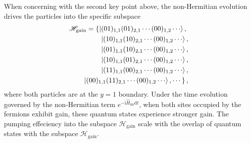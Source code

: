 \documentclass[longbibliography, aps, prx, amsmath, amssymb, amsfonts, twocolumn,superscriptaddress, footinbib]{revtex4-1}
\begin{document}
	When concerning with the second key point above,
	the non-Hermitian evolution drives the particles into the specific subspace
	\begin{equation}
		\begin{split}
			\mathscr{H}_{\text{gain}}=\left\{ \ket{(01)_{1,1}(01)_{2,1}\cdots(00)_{1,2}\cdots}, \right.\\
			\ket{(10)_{1,1}(10)_{2,1}\cdots(00)_{1,2}\cdots},  \\
			\ket{(01)_{1,1}(10)_{2,1}\cdots(00)_{1,2}\cdots},\\
			\ket{(10)_{1,1}(01)_{2,1}\cdots(00)_{1,2}\cdots},\\
			\ket{(11)_{1,1}(00)_{2,1}\cdots(00)_{1,2}\cdots},\\
			\left.\ket{(00)_{1,1}(11)_{2,1}\cdots(00)_{1,2}\cdots}, \cdots \right\},
		\end{split}
	\end{equation}
	where both particles are at the $y=1$ boundary.
	Under the time evolution governed by the non-Hermitian term $e^{-\mathrm{i}\hat{H}_{\text{im}} \mathrm{d}t}$, when both sites occupied by the fermions exhibit gain, these quantum states experience stronger gain. 
	The pumping effeciency into the subspace $\mathscr{H}_{\text{gain}}$ 
	scale with the overlap of quantum states with the subspace $\mathscr{H}_{\text{gain}}$. 
\end{document}
